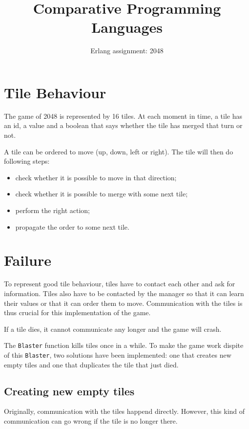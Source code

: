 \documentclass{taak}
\begin{document}
\title{Comparative Programming Languages}
\subtitle{Erlang assignment: 2048}

\maketitlepage


\section{Tile Behaviour}
The game of 2048 is represented by 16 tiles. At each moment in time, a tile has an id, a value and a boolean that says whether the tile has merged that turn or not.

A tile can be ordered to move (up, down, left or right). The tile will then do following steps:
\begin{itemize}
	\item check whether it is possible to move in that direction;
	\item check whether it is possible to merge with some next tile;
	\item perform the right action;
	\item propagate the order to some next tile.
\end{itemize}

\section{Failure}
To represent good tile behaviour, tiles have to contact each other and ask for information. Tiles also have to be contacted by the manager so that it can learn their values or that it can order them to move. Communication with the tiles is thus crucial for this implementation of the game.

If a tile dies, it cannot communicate any longer and the game will crash.

The \texttt{Blaster} function kills tiles once in a while. To make the game work dispite of this \texttt{Blaster}, two solutions have been implemented: one that creates new empty tiles and one that duplicates the tile that just died.

\subsection{Creating new empty tiles}
Originally, communication with the tiles happend directly. However, this kind of communication can go wrong if the tile is no longer there.
\end{document}

